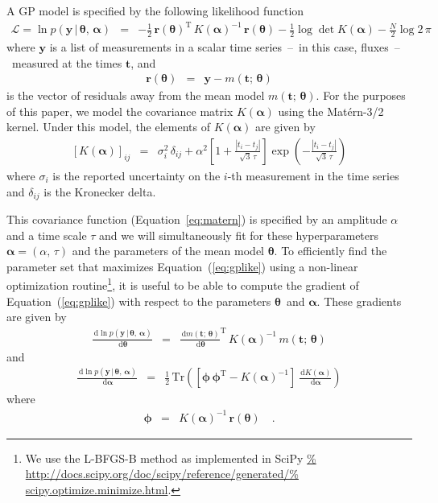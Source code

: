 \documentclass[manuscript, letterpaper]{aastex6}
\renewcommand{\eqref}[1]{\ref{eq:#1}}
\newcommand{\Eq}[1]{Equation~(\eqref{#1})}
\newcommand{\eq}[1]{\Eq{#1}}
\newcommand{\eqalt}[1]{Equation~\eqref{#1}}
\newcommand{\eqlabel}[1]{\label{eq:#1}}
\newcommand{\T}{\ensuremath{\mathrm{T}}}
\newcommand{\dd}{\ensuremath{\,\mathrm{d}}}
\newcommand{\bvec}[1]{{\ensuremath{\boldsymbol{#1}}}}
\newcommand{\meanpars}{{\ensuremath{\bvec{\theta}}}}
\newcommand{\kernpars}{{\ensuremath{\bvec{\alpha}}}}
\begin{document}
A GP model is specified by the following likelihood function
\begin{eqnarray}\eqlabel{gplike}
\mathcal{L} = \ln p(\bvec{y}\,|\,\meanpars,\,\kernpars) &=&
- \frac{1}{2}\,\bvec{r}(\meanpars)^\T\,K(\kernpars)^{-1}\,
    \bvec{r}(\meanpars)
- \frac{1}{2}\log\det K(\kernpars) - \frac{N}{2} \log{2\,\pi}
\end{eqnarray}
where \bvec{y} is a list of measurements in a scalar time series~--~in this
case, fluxes~--~measured at the times \bvec{t}, and
\begin{eqnarray}
\bvec{r}(\meanpars) &=& \bvec{y} - m(\bvec{t};\,\meanpars)
\end{eqnarray}
is the vector of residuals away from the mean model $m(\bvec{t};\,\meanpars)$.
For the purposes of this paper, we model the covariance matrix $K(\kernpars)$
using the Mat\'ern-3/2 kernel.
Under this model, the elements of $K(\kernpars)$ are given by
\begin{eqnarray}\eqlabel{matern}
\left[ K(\kernpars) \right]_{ij} &=& \sigma_i^2\,\delta_{ij}
    + \alpha^2 \left[ 1+\frac{|t_i - t_j|}{\sqrt{3}\,\tau} \right]
      \exp \left(-\frac{|t_i - t_j|}{\sqrt{3}\,\tau}\right)
\end{eqnarray}
where $\sigma_i$ is the reported uncertainty on the $i$-th measurement in the
time series and $\delta_{ij}$ is the Kronecker delta.

This covariance function (\eqalt{matern}) is specified by an amplitude
$\alpha$ and a time scale $\tau$ and we will simultaneously fit for these
hyperparameters $\kernpars=(\alpha,\,\tau)$ and the parameters of the mean
model \meanpars.
To efficiently find the parameter set that maximizes \eq{gplike} using a
non-linear optimization routine\footnote{We use the L-BFGS-B method as
implemented in SciPy \url{%
http://docs.scipy.org/doc/scipy/reference/generated/%
scipy.optimize.minimize.html}.},
it is useful to be able to compute the gradient of \eq{gplike} with respect to
the parameters \meanpars\ and \kernpars.
These gradients are given by
\begin{eqnarray}\eqlabel{gpmeangrad}
\frac{\dd\ln p(\bvec{y}\,|\,\meanpars,\,\kernpars)}{\dd \meanpars} &=&
\frac{\dd m(\bvec{t};\,\meanpars)}{\dd\meanpars}^\T \, K(\kernpars)^{-1} \,
    m(\bvec{t};\,\meanpars)
\end{eqnarray}
and
\begin{eqnarray}
\frac{\dd\ln p(\bvec{y}\,|\,\meanpars,\,\kernpars)}{\dd \kernpars} &=&
\frac{1}{2}\,\mathrm{Tr}\left(
    \left[ \bvec{\phi}\,\bvec{\phi}^\T - K(\kernpars)^{-1} \right]
    \,\frac{\dd K(\kernpars)}{\dd\kernpars}
\right)
\end{eqnarray}
where
\begin{eqnarray}
\bvec{\phi} &=& K(\kernpars)^{-1}\,\bvec{r}(\meanpars) \quad.
\end{eqnarray}
\end{document}
